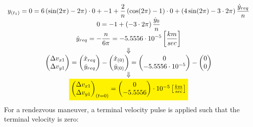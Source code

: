 \documentclass[11pt, a4paper]{article}
\begin{document}
\begin{equation}
    \begin{array}{c}
        \displaystyle y_{(t_1)} = 0 = 6\left(\sin(2\pi)-2\pi\right)\cdot 0 + -1 + \frac{2}{n}\left(\cos(2\pi)-1\right)\cdot0 + \left(4\sin(2\pi)-3\cdot2\pi\right)\frac{\dot{y}_{req}}{n} \\
        \displaystyle0 = -1 + \left(-3\cdot2\pi\right)\frac{\dot{y}_0}{n} \\
        \displaystyle\dot{y}_{req} = -\frac{n}{6\pi} = -5.5556\cdot10^{-5} \left[\frac{km}{sec}\right] \\
        \Downarrow \\
        \begin{pmatrix}
            \Delta v_{x1} \\ \Delta v_{y1}
        \end{pmatrix} = \begin{pmatrix}
            \dot{x}_{req} \\ \dot{y}_{req}
        \end{pmatrix} - \begin{pmatrix}
            \dot{x}_{(0)} \\ \dot{y}_{(0)}
        \end{pmatrix} = \begin{pmatrix}
            0 \\ -5.5556\cdot10^{-5}
        \end{pmatrix} - \begin{pmatrix}
            0 \\ 0
        \end{pmatrix} \\
        \Downarrow \\
        \colorbox{yellow}{$ \begin{pmatrix}
            \Delta v_{x1} \\ \Delta v_{y1}
        \end{pmatrix}_{(t=0)} = \begin{pmatrix}
            0 \\ -5.5556
        \end{pmatrix}\cdot10^{-5}\left[\frac{km}{sec}\right]$}
    \end{array}
\end{equation}
For a rendezvous maneuver, a terminal velocity pulse is applied such that the terminal velocity is zero:
\end{document}
